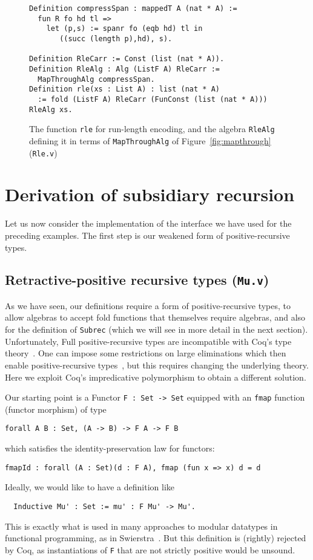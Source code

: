\documentclass[a4paper,USenglish]{lipics-v2021}
\begin{document}
\begin{figure}
\begin{verbatim}
Definition compressSpan : mappedT A (nat * A) :=
  fun R fo hd tl =>
    let (p,s) := spanr fo (eqb hd) tl in
       ((succ (length p),hd), s).

Definition RleCarr := Const (list (nat * A)).
Definition RleAlg : Alg (ListF A) RleCarr :=
  MapThroughAlg compressSpan.
Definition rle(xs : List A) : list (nat * A)
  := fold (ListF A) RleCarr (FunConst (list (nat * A))) RleAlg xs.
\end{verbatim}
\caption{The function \texttt{rle} for run-length encoding, and the algebra \texttt{RleAlg} defining it
in terms of \texttt{MapThroughAlg} of Figure~\ref{fig:mapthrough} (\texttt{Rle.v})}
\label{fig:rle}
\end{figure}

\section{Derivation of subsidiary recursion}
\label{sec:deriv}

Let us now consider the implementation of the
interface we have used for the preceding examples.
The first step is our weakened form of positive-recursive
types.

\subsection{Retractive-positive recursive types (\texttt{Mu.v})}
\label{sec:mu}

As we have seen, our definitions require a form of positive-recursive
types, to allow algebras to accept fold functions that themselves
require algebras, and also for the definition of \verb|Subrec| (which
we will see in more detail in the next section).  Unfortunately, Full
positive-recursive types are incompatible with Coq's type
theory~\cite{coquand88}.  One can impose some restrictions on large
eliminations which then enable positive-recursive
types~\cite{blanqui05}, but this requires changing the underlying
theory.  Here we exploit Coq's impredicative polymorphism to obtain a
different solution.

Our starting point is a Functor \verb|F : Set -> Set| equipped with an
\verb|fmap| function (functor morphism) of type
\begin{verbatim}
forall A B : Set, (A -> B) -> F A -> F B
\end{verbatim}
\noindent which satisfies the identity-preservation law for functors:
\begin{verbatim}
fmapId : forall (A : Set)(d : F A), fmap (fun x => x) d = d
\end{verbatim}
\noindent Ideally, we would like to have a definition like
\begin{verbatim}
  Inductive Mu' : Set := mu' : F Mu' -> Mu'.
\end{verbatim}
\noindent This is exactly what is used in many approaches to modular
datatypes in functional programming, as in
Swierstra~\cite{swierstra08}.  But this definition is (rightly)
rejected by Coq, as instantiations of \verb|F| that are not strictly
positive would be unsound.
\end{document}
